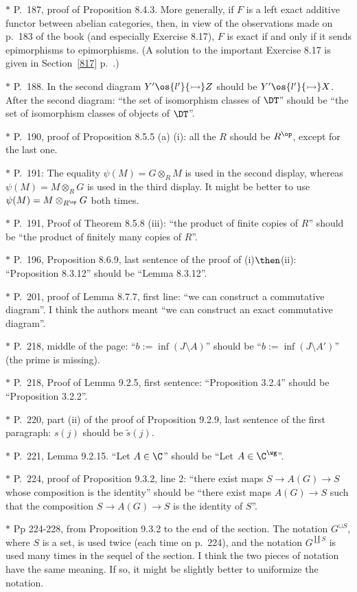 \documentclass[12pt]{article}
\theoremstyle{remark}
\theoremstyle{definition}
\begin{document}
\nn$*$ P.~187, proof of Proposition 8.4.3. More generally, if $F$ is a left exact additive functor between abelian categories, then, in view of the observations made on p.~183 of the book (and especially Exercise 8.17), $F$ is exact if and only if it sends epimorphisms to epimorphisms. (A solution to the important Exercise 8.17 is given in Section~\ref{817} p.~.)

\nn$*$ P.~188. In the second diagram $Y'\os{l'}{\rightarrowtail}Z$ should be $Y'\os{l'}{\rightarrowtail}X$. After the second diagram: ``the set of isomorphism classes of $\DT$'' should be ``the set of isomorphism classes of objects of $\DT$''.

\nn$*$ P.~190, proof of Proposition 8.5.5 (a) (i): all the $R$ should be $R^{\op}$, except for the last one.

\nn$*$ P.~191: The equality $\psi(M)=G\otimes_RM$ is used in the second display, whereas $\psi(M)=M\otimes_RG$ is used in the third display. It might be better to use $\psi(M)=M\otimes_{R^{\op}}G$ both times. 

\nn$*$ P.~191, Proof of Theorem 8.5.8 (iii): ``the product of finite copies of $R$'' should be ``the product of finitely many copies of $R$''.

\nn$*$ P.~196, Proposition 8.6.9, last sentence of the proof of (i)$\then$(ii): ``Proposition 8.3.12'' should be ``Lemma 8.3.12''.

\nn$*$ P.~201, proof of Lemma 8.7.7, first line: ``we can construct a commutative diagram''. I think the authors meant ``we can construct an exact commutative diagram''.

\nn$*$ P.~218, middle of the page: ``$b:=\inf(J\setminus A)$'' should be ``$b:=\inf(J\setminus A')$'' (the prime is missing). 

\nn$*$ P.~218, Proof of Lemma 9.2.5, first sentence: ``Proposition 3.2.4'' should be ``Proposition 3.2.2''.

\nn$*$ P.~220, part (ii) of the proof of Proposition 9.2.9, last sentence of the first paragraph: $s(j)$ should be $\tilde s(j)$.

\nn$*$ P.~221, Lemma 9.2.15. ``Let $A\in\C$'' should be ``Let $A\in\C^\wg$''.

\nn$*$ P.~224, proof of Proposition 9.3.2, line 2: ``there exist maps $S\to A(G)\to S$ whose composition is the identity'' should be ``there exist maps $A(G)\to S$ such that the composition $S\to A(G)\to S$ is the identity of $S$''.

\nn$*$ Pp 224-228, from Proposition 9.3.2 to the end of the section. The notation $G^{\sqcup S}$, where $S$ is a set, is used twice (each time on p.~224), and the notation $G^{\coprod S}$ is used many times in the sequel of the section. I think the two pieces of notation have the same meaning. If so, it might be slightly better to uniformize the notation.
\end{document}
